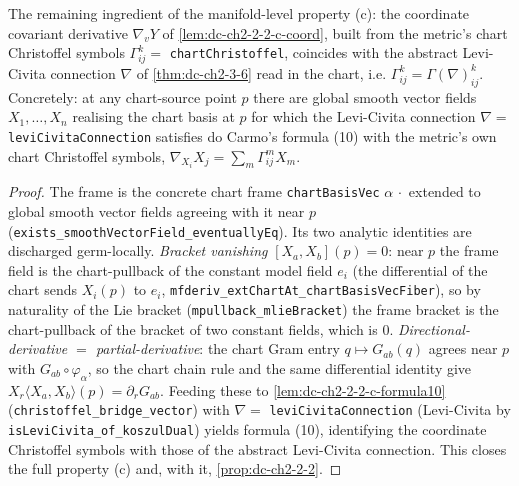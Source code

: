 \begin{lemma}
  \label{lem:dc-ch2-2-2-c-bridge}
  \leanok
  The remaining ingredient of the manifold-level property (c): the coordinate covariant
  derivative $\nabla_v Y$ of \cref{lem:dc-ch2-2-2-c-coord}, built from the metric's chart
  Christoffel symbols $\Gamma^k_{ij}=$ \texttt{chartChristoffel}, coincides with the abstract
  Levi-Civita connection $\nabla$ of \cref{thm:dc-ch2-3-6} read in the chart, i.e.
  $\Gamma^k_{ij}=\Gamma(\nabla)^k_{ij}$. Concretely: at any chart-source point $p$ there are
  global smooth vector fields $X_1,\dots,X_n$ realising the chart basis at $p$ for which the
  Levi-Civita connection $\nabla=$ \texttt{leviCivitaConnection} satisfies do Carmo's formula (10)
  with the metric's own chart Christoffel symbols, $\nabla_{X_i}X_j=\sum_m\Gamma^m_{ij}X_m$.
  \begin{proof}
    \leanok
    The frame is the concrete chart frame \texttt{chartBasisVec} $\alpha\,\cdot$ extended to
    global smooth vector fields agreeing with it near $p$
    (\texttt{exists\_smoothVectorField\_eventuallyEq}). Its two analytic identities are
    discharged germ-locally. \emph{Bracket vanishing} $[X_a,X_b](p)=0$: near $p$ the frame
    field is the chart-pullback of the constant model field $e_i$ (the differential of the chart
    sends $X_i(p)$ to $e_i$, \texttt{mfderiv\_extChartAt\_chartBasisVecFiber}), so by naturality
    of the Lie bracket (\texttt{mpullback\_mlieBracket}) the frame bracket is the chart-pullback
    of the bracket of two constant fields, which is $0$. \emph{Directional-derivative $=$
    partial-derivative}: the chart Gram entry $q\mapsto G_{ab}(q)$ agrees near $p$ with
    $G_{ab}\circ\varphi_\alpha$, so the chart chain rule and the same differential identity give
    $X_r\langle X_a,X_b\rangle(p)=\partial_r G_{ab}$. Feeding these to
    \cref{lem:dc-ch2-2-2-c-formula10} (\texttt{christoffel\_bridge\_vector}) with
    $\nabla=$ \texttt{leviCivitaConnection} (Levi-Civita by
    \texttt{isLeviCivita\_of\_koszulDual}) yields formula (10), identifying the coordinate
    Christoffel symbols with those of the abstract Levi-Civita connection. This closes the full
    property (c) and, with it, \cref{prop:dc-ch2-2-2}.
  \end{proof}
\end{lemma}

